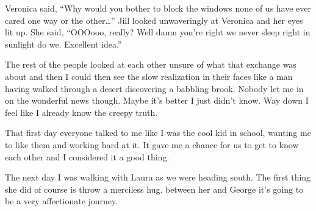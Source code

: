 Veronica said, ``Why would you bother to block the windows none of us have ever cared one way or the other\dots'' Jill looked unwaveringly at Veronica and her eyes lit up. She said, ``OOOooo, really? Well damn you're right we never sleep right in sunlight do we. Excellent idea.''

The rest of the people looked at each other unsure of what that exchange was about and then I could then see the slow realization in their faces like a man having walked through a desert discovering a babbling brook. Nobody let me in on the wonderful news though. Maybe it's better I just didn't know. Way down I feel like I already know the creepy truth.

That first day everyone talked to me like I was the cool kid in school, wanting me to like them and working hard at it. It gave me a chance for us to get to know each other and I considered it a good thing.

The next day I was walking with Laura as we were heading south. The first thing she did of course is throw a merciless hug. between her and George it's going to be a very affectionate journey. 